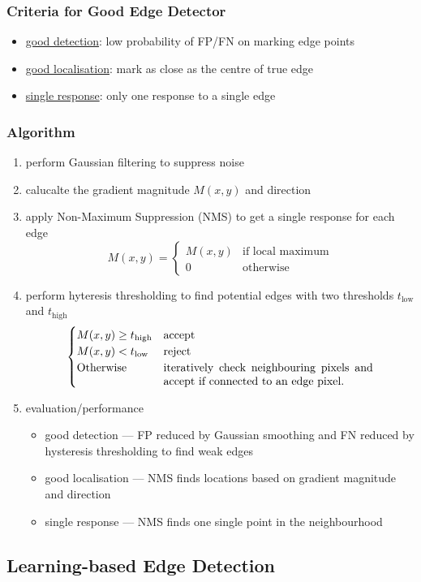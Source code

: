 \documentclass[twocolumn,landscape,10pt]{article}
\theoremstyle{definition}
\begin{document}
\subsubsection{Criteria for Good Edge Detector}

\begin{itemize}
    \item \underline{good detection}: low probability of FP/FN on marking edge points
    \item \underline{good localisation}: mark as close as the centre of true edge
    \item \underline{single response}: only one response to a single edge
\end{itemize} 

\subsubsection{Algorithm}

\begin{enumerate}
    \item perform Gaussian filtering to suppress noise
    \item calucalte the gradient magnitude $M(x,y)$ and direction
    \item apply Non-Maximum Suppression (NMS) to get a single response for each
        edge
        \[
            M(x,y)=
            \begin{cases}
                M(x,y) & \text{if local maximum} \\
                0 & \text{otherwise}
            \end{cases} 
        \]
    \item perform hyteresis thresholding to find potential edges with two
        thresholds $t_\text{low}$ and $t_\text{high}$\\
        \[
            \begin{cases}
                M(x,y) \ge t_\text{high} & \text{accept} \\
                M(x,y) < t_\text{low} & \text{reject} \\
                \text{Otherwise} & \text{\parbox[t]{6.5cm}{iteratively check neighbouring pixels 
                and accept if connected to an edge pixel.}}
            \end{cases} 
        \]
    \item evaluation/performance
        \begin{itemize}
            \item good detection --- FP reduced by Gaussian smoothing and FN
                reduced by hysteresis thresholding to find weak edges
            \item good localisation --- NMS finds locations based on gradient
                magnitude and direction
            \item single response --- NMS finds one single point in the
                neighbourhood
        \end{itemize} 
\end{enumerate} 


\subsection{Learning-based Edge Detection}
\end{document}
